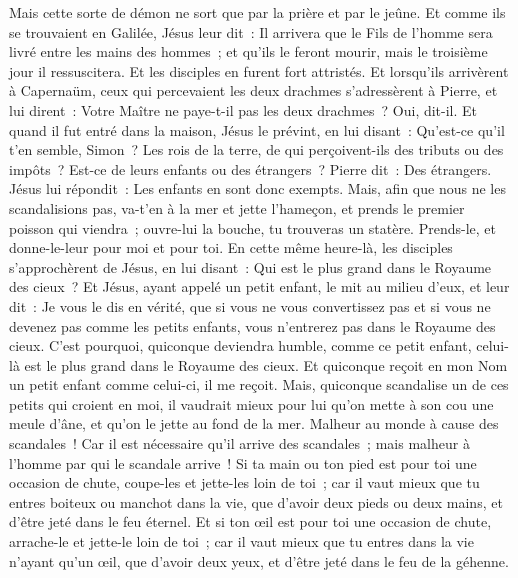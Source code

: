 \begin{multicols}{2}
Mais cette sorte de démon ne sort que par la prière et par le jeûne.
Et comme ils se trouvaient en Galilée, Jésus leur dit~: Il arrivera que le Fils de l'homme sera livré entre les mains des hommes~;
et qu'ils le feront mourir, mais le troisième jour il ressuscitera. Et les disciples en furent fort attristés.
Et lorsqu'ils arrivèrent à Capernaüm, ceux qui percevaient les deux drachmes s'adressèrent à Pierre, et lui dirent~: Votre Maître ne paye-t-il pas les deux drachmes~?
Oui, dit-il. Et quand il fut entré dans la maison, Jésus le prévint, en lui disant~: Qu'est-ce qu'il t'en semble, Simon~? Les rois de la terre, de qui perçoivent-ils des tributs ou des impôts~? Est-ce de leurs enfants ou des étrangers~?
Pierre dit~: Des étrangers. Jésus lui répondit~: Les enfants en sont donc exempts.
Mais, afin que nous ne les scandalisions pas, va-t'en à la mer et jette l'hameçon, et prends le premier poisson qui viendra~; ouvre-lui la bouche, tu trouveras un statère. Prends-le, et donne-le-leur pour moi et pour toi.
\VerseOne{}En cette même heure-là, les disciples s'approchèrent de Jésus, en lui disant~: Qui est le plus grand dans le Royaume des cieux~?
Et Jésus, ayant appelé un petit enfant, le mit au milieu d'eux,
et leur dit~: Je vous le dis en vérité, que si vous ne vous convertissez pas et si vous ne devenez pas comme les petits enfants, vous n'entrerez pas dans le Royaume des cieux.
C'est pourquoi, quiconque deviendra humble, comme ce petit enfant, celui-là est le plus grand dans le Royaume des cieux.
Et quiconque reçoit en mon Nom un petit enfant comme celui-ci, il me reçoit.
Mais, quiconque scandalise un de ces petits qui croient en moi, il vaudrait mieux pour lui qu'on mette à son cou une meule d'âne, et qu'on le jette au fond de la mer.
Malheur au monde à cause des scandales~! Car il est nécessaire qu'il arrive des scandales~; mais malheur à l'homme par qui le scandale arrive~!
Si ta main ou ton pied est pour toi une occasion de chute, coupe-les et jette-les loin de toi~; car il vaut mieux que tu entres boiteux ou manchot dans la vie, que d'avoir deux pieds ou deux mains, et d'être jeté dans le feu éternel.
Et si ton œil est pour toi une occasion de chute, arrache-le et jette-le loin de toi~; car il vaut mieux que tu entres dans la vie n'ayant qu'un œil, que d'avoir deux yeux, et d'être jeté dans le feu de la géhenne.

\end{multicols}
